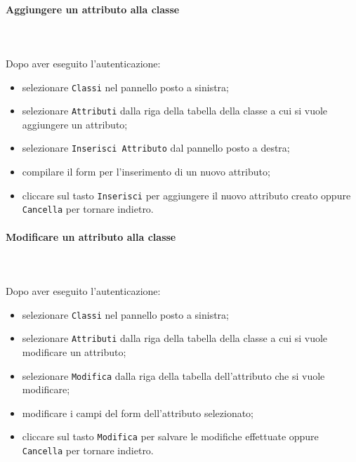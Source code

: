 	\paragraph{Aggiungere un attributo alla classe} \mbox{}\\ \mbox{}\\
	Dopo aver eseguito l'autenticazione:
	\begin{itemize}
		\item selezionare \texttt{Classi} nel pannello posto a sinistra;
		\item selezionare \texttt{Attributi} dalla riga della tabella della classe
		a cui si vuole aggiungere un attributo;
		\item selezionare \texttt{Inserisci Attributo} dal pannello posto a destra;
		\item compilare il form per l'inserimento di un nuovo attributo;
		\item cliccare sul tasto \texttt{Inserisci} per aggiungere il nuovo attributo 
		creato oppure \texttt{Cancella} per tornare indietro.	
	\end{itemize}
	
	\paragraph{Modificare un attributo alla classe} \mbox{}\\ \mbox{}\\
	Dopo aver eseguito l'autenticazione:
	\begin{itemize}
		\item selezionare \texttt{Classi} nel pannello posto a sinistra;
		\item selezionare \texttt{Attributi} dalla riga della tabella della classe
		a cui si vuole modificare un attributo;\
		\item selezionare \texttt{Modifica} dalla riga della tabella dell'attributo
		che si vuole modificare;
		\item modificare i campi del form dell'attributo selezionato;
		\item cliccare sul tasto \texttt{Modifica} per salvare le modifiche effettuate
		oppure \texttt{Cancella} per tornare indietro.
	\end{itemize}
	
